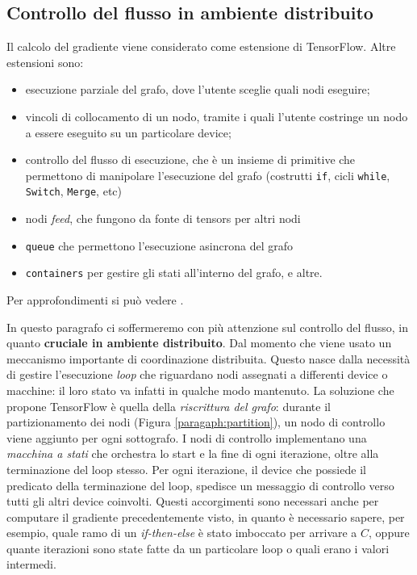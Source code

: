 \documentclass[DIV=calc, paper=a4, fontsize=11pt]{scrartcl}	 %
\begin{document}
\begin{multicols}{2}
				\subsection{Controllo del flusso in ambiente distribuito}
				Il calcolo del gradiente viene considerato come estensione di TensorFlow. Altre estensioni sono:
				\begin{itemize}
					\item esecuzione parziale del grafo, dove l'utente sceglie quali nodi eseguire;
					\item vincoli di collocamento di un nodo, tramite i quali l'utente costringe un nodo a essere eseguito su un particolare device;
					\item controllo del flusso di esecuzione, che è un insieme di primitive che permettono di manipolare l'esecuzione del grafo (costrutti \texttt{if}, cicli \texttt{while}, \texttt{Switch}, \texttt{Merge}, etc)
					\item nodi \textit{feed}, che fungono da fonte di tensors per altri nodi 
					\item \texttt{queue} che permettono l'esecuzione asincrona del grafo
					\item\texttt{containers} per gestire gli stati all'interno del grafo, e altre.
				\end{itemize}
				Per approfondimenti si può vedere \cite{tf}.
				
				In questo paragrafo ci soffermeremo con più attenzione sul controllo del flusso, in quanto \textbf{cruciale in ambiente distribuito}. Dal momento che viene usato un meccanismo importante di coordinazione distribuita. Questo nasce dalla necessità di gestire l'esecuzione \textit{loop} che riguardano nodi assegnati a differenti device o macchine: il loro stato va infatti in qualche modo mantenuto. La soluzione che propone TensorFlow è quella della \textit{riscrittura del grafo}: durante il partizionamento dei nodi (Figura \ref{paragaph:partition}), un nodo di controllo viene aggiunto per ogni sottografo. I nodi di controllo implementano una \textit{macchina a stati} che orchestra lo start e la fine di ogni iterazione, oltre alla terminazione del loop stesso. Per ogni iterazione, il device che possiede il predicato della terminazione del loop, spedisce un messaggio di controllo verso tutti gli altri device coinvolti. Questi accorgimenti sono necessari anche per computare il gradiente precedentemente visto, in quanto è necessario sapere, per esempio, quale ramo di un \textit{if-then-else}	è stato imboccato per arrivare a $C$, oppure quante iterazioni sono state fatte da un particolare loop o quali erano i valori intermedi.
		

\end{multicols}
\end{document}
